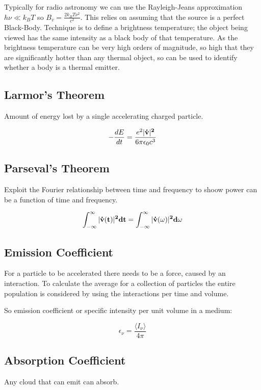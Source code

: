 \documentclass[]{article}
\begin{document}
Typically for radio astronomy we can use the Rayleigh-Jeans approximation $h\nu \ll k_BT$ so $B_v = \frac{2k_BT\nu^2}{c^2}$. This relies on assuming that the source is a perfect Black-Body. Technique is to define a brightness temperature; the object being viewed has the same intensity as a black body of that temperature. As the brightness temperature can be very high orders of magnitude, so high that they are significantly hotter than any thermal object, so can be used to identify whether a body is a thermal emitter.

\subsection{Larmor's Theorem}

Amount of energy lost by a single accelerating charged particle.

\begin{equation}
	-\frac{dE}{dt} = \frac{e^2|\bf{\dot{v}}|^2}{6\pi\epsilon_0c^3}
\end{equation}

\subsection{Parseval's Theorem}
Exploit the Fourier relationship between time and frequency to shoow power can be a function of time and frequency.


\begin{equation}
\int_{-\infty}^{\infty}|\bf{\dot{v}(t)}|^2dt = \int_{-\infty}^{\infty}|\bf{\dot{v}}(\omega)|^2d\omega
\end{equation}
 
 \subsection{Emission Coefficient}
 For a particle to be accelerated there needs to be a force, caused by an interaction. To calculate the average for a collection of particles the entire population is considered by using the interactions per time and volume.
 
 So emission coefficient or specific intensity per unit volume in a medium:
 
 \begin{equation}
 \epsilon_\nu = \frac{\langle I_\nu\rangle}{4\pi}
 \end{equation}
 
 \subsection{Absorption Coefficient}
 Any cloud that can emit can absorb.
 
\end{document}
